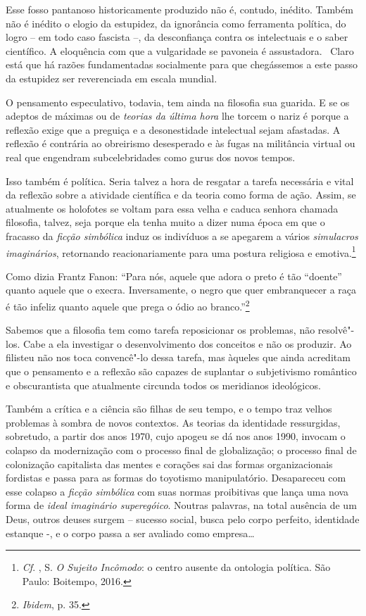 Esse fosso pantanoso historicamente produzido não é, contudo, inédito.
Também não é inédito o elogio da estupidez, da ignorância como
ferramenta política, do logro -- em todo caso fascista --, da
desconfiança contra os intelectuais e o saber científico. A eloquência
com que a vulgaridade se pavoneia é assustadora.~ Claro está que há
razões fundamentadas socialmente para que chegássemos a este passo da
estupidez ser reverenciada em escala mundial.

O pensamento especulativo, todavia, tem ainda na filosofia sua guarida.
E se os adeptos de máximas ou de \emph{teorias da última hora} lhe
torcem o nariz é porque a reflexão exige que a preguiça e a
desonestidade intelectual sejam afastadas. A reflexão é contrária ao
obreirismo desesperado e às fugas na militância virtual ou real que
engendram subcelebridades como gurus dos novos tempos.

Isso também é política. Seria talvez a hora de resgatar a tarefa
necessária e vital da reflexão sobre a atividade científica e da teoria
como forma de ação. Assim, se atualmente os holofotes se voltam para
essa velha e caduca senhora chamada filosofia, talvez, seja porque ela
tenha muito a dizer numa época em que o fracasso da \emph{ficção
simbólica} induz os indivíduos a se apegarem a vários \emph{simulacros
imaginários}, retornando reacionariamente para uma postura religiosa e
emotiva.\footnote{\emph{Cf}. , S. \emph{O
  Sujeito Incômodo}: o centro ausente da ontologia política. São Paulo:
  Boitempo, 2016.}

Como dizia Frantz Fanon: ``Para nós, aquele que adora o preto é tão
``doente'' quanto aquele que o execra. Inversamente, o negro que quer
embranquecer a raça é tão infeliz quanto aquele que prega o ódio ao
branco.''\footnote{\emph{Ibidem}, p. 35.}

Sabemos que a filosofia tem como tarefa reposicionar os problemas, não
resolvê"-los. Cabe a ela investigar o desenvolvimento dos conceitos e não
os produzir. Ao filisteu não nos toca convencê"-lo dessa tarefa, mas
àqueles que ainda acreditam que o pensamento e a reflexão são capazes de
suplantar o subjetivismo romântico e obscurantista que atualmente
circunda todos os meridianos ideológicos.

Também a crítica e a ciência são filhas de seu tempo, e o tempo traz
velhos problemas à sombra de novos contextos. As teorias da identidade
ressurgidas, sobretudo, a partir dos anos 1970, cujo apogeu se dá nos
anos 1990, invocam o colapso da modernização com o processo final de
globalização; o processo final de colonização capitalista das mentes e
corações sai das formas organizacionais fordistas e passa para as formas
do toyotismo manipulatório. Desapareceu com esse colapso a \emph{ficção
simbólica} com suas normas proibitivas que lança uma nova forma de
\emph{ideal imaginário superegóico}. Noutras palavras, na total ausência
de um Deus, outros deuses surgem -- sucesso social, busca pelo corpo
perfeito, identidade estanque -, e o corpo passa a ser avaliado como
empresa\ldots{}

